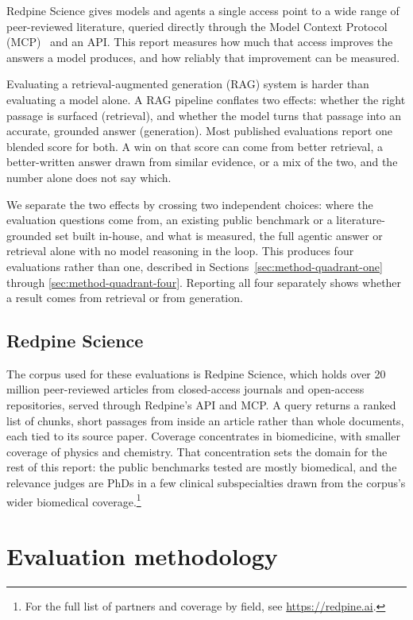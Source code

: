 \documentclass[sn-mathphys,Numbered]{sn-jnl}%
\begin{document}
Redpine Science gives models and agents a single access point to a wide range of
peer-reviewed literature, queried directly through the Model Context Protocol
(MCP)~\cite{mcp} and an API. This
report measures how much that access improves the answers a model produces, and how
reliably that improvement can be measured.

Evaluating a retrieval-augmented generation (RAG) system is harder than evaluating a
model alone. A RAG pipeline conflates two effects: whether the right passage is surfaced
(retrieval), and whether the model turns that passage into an accurate, grounded answer
(generation). Most published evaluations report one blended score for both. A win on
that score can come from better retrieval, a better-written answer drawn from similar
evidence, or a mix of the two, and the number alone does not say which.

We separate the two effects by crossing two independent choices: where the evaluation
questions come from, an existing public benchmark or a literature-grounded set built
in-house, and what is measured, the full agentic answer or retrieval alone with no
model reasoning in the loop. This produces four evaluations rather than one, described
in Sections~\ref{sec:method-quadrant-one} through \ref{sec:method-quadrant-four}.
Reporting all four separately shows whether a result comes from retrieval or from
generation.

\subsection{Redpine Science}\label{sec:redpine-science}

The corpus used for these evaluations is Redpine Science, which holds over 20
million peer-reviewed articles from closed-access journals and open-access
repositories, served through Redpine's API and MCP. A query returns a ranked list
of chunks, short passages from inside an article rather than whole documents, each
tied to its source paper.
Coverage concentrates in biomedicine, with smaller coverage of physics and
chemistry. That concentration sets the domain for the rest of this report: the
public benchmarks tested are mostly biomedical, and the relevance judges are PhDs
in a few clinical subspecialties drawn from the corpus's wider biomedical
coverage.\footnote{For the full list of partners and coverage by field, see
\url{https://redpine.ai}.}

\section{Evaluation methodology}\label{sec:methodology}
\end{document}
